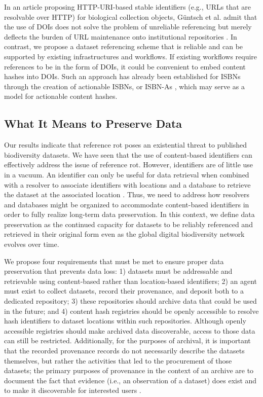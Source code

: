 In an article proposing HTTP-URI-based stable identifiers (e.g., URLs that are resolvable over HTTP) for biological collection objects, Güntsch et al. admit that the use of DOIs does not solve the problem of unreliable referencing but merely deflects the burden of URL maintenance onto institutional repositories \citep{G_ntsch_2017}. In contrast, we propose a dataset referencing scheme that is reliable and can be supported by existing infrastructures and workflows. If existing workflows require references to be in the form of DOIs, it could be convenient to embed content hashes into DOIs. Such an approach has already been established for ISBNs through the creation of actionable ISBNs, or ISBN-As \citep{Weissberg_2008}, which may serve as a model for actionable content hashes.

\subsection*{What It Means to Preserve Data}
Our results indicate that reference rot poses an existential threat to published biodiversity datasets. We have seen that the use of content-based identifiers can effectively address the issue of reference rot. However, identifiers are of little use in a vacuum. An identifier can only be useful for data retrieval when combined with a resolver to associate identifiers with locations and a database to retrieve the dataset at the associated location \citep{Paskin_1999}. Thus, we need to address how resolvers and databases might be organized to accommodate content-based identifiers in order to fully realize long-term data preservation. In this context, we define data preservation as the continued capacity for datasets to be reliably referenced and retrieved in their original form even as the global digital biodiversity network evolves over time.

We propose four requirements that must be met to ensure proper data preservation that prevents data loss: 1) datasets must be addressable and retrievable using content-based rather than location-based identifiers; 2) an agent must exist to collect datasets, record their provenance, and deposit both to a dedicated repository; 3) these repositories should archive data that could be used in the future; and 4) content hash registries should be openly accessible to resolve hash identifiers to dataset locations within such repositories. Although openly accessible registries should make archived data discoverable, access to those data can still be restricted. Additionally, for the purposes of archival, it is important that the recorded provenance records do not necessarily describe the datasets themselves, but rather the activities that led to the procurement of those datasets; the primary purposes of provenance in the context of an archive are to document the fact that evidence (i.e., an observation of a dataset) does exist and to make it discoverable for interested users \citep{Bearman_1995}.

